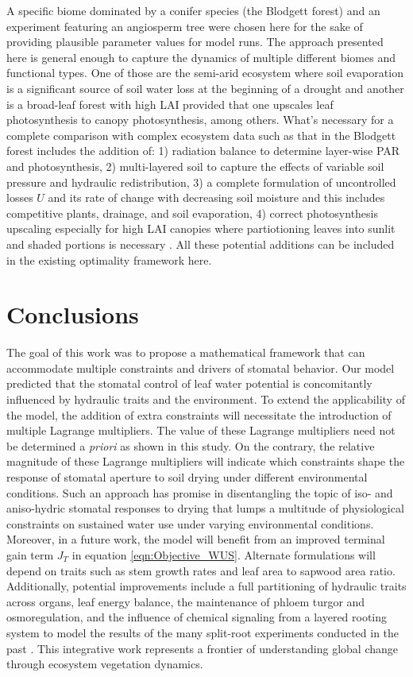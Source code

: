 \documentclass[utf8]{frontiersSCNS} %
\begin{document}
A specific biome dominated by a conifer species (the Blodgett forest) and an experiment featuring an angiosperm tree were chosen here for the sake of providing plausible parameter values for model runs. The approach presented here is general enough to capture the dynamics of multiple different biomes and functional types. One of those are the semi-arid ecosystem where soil evaporation is a significant source of soil water loss at the beginning of a drought and another is a broad-leaf forest with high LAI provided that one upscales leaf photosynthesis to canopy photosynthesis, among others. What's necessary for a complete comparison with complex ecosystem data such as that in the Blodgett forest includes the addition of: 1) radiation balance to determine layer-wise PAR and photosynthesis, 2) multi-layered soil to capture the effects of variable soil pressure and hydraulic redistribution, 3) a complete formulation of uncontrolled losses $U$ and its rate of change with decreasing soil moisture and this includes competitive plants, drainage, and soil evaporation, 4) correct photosynthesis upscaling especially for high LAI canopies where partiotioning leaves into sunlit and shaded portions is necessary \citep{pury_1997}. All these potential additions can be included in the existing optimality framework here. 

\section{Conclusions}
The goal of this work was to propose a mathematical framework that can accommodate multiple constraints and drivers of stomatal behavior. Our model predicted that the stomatal control of leaf water potential is concomitantly influenced by hydraulic traits and the environment. To extend the applicability of the model, the addition of extra constraints will necessitate the introduction of multiple Lagrange multipliers. The value of these Lagrange multipliers need not be determined a \textit{priori} as shown in this study. On the contrary, the relative magnitude of these Lagrange multipliers will indicate which constraints shape the response of stomatal aperture to soil drying under different environmental conditions. Such an approach has promise in disentangling the topic of iso- and aniso-hydric stomatal responses to drying that lumps a multitude of physiological constraints on sustained water use under varying environmental conditions. Moreover, in a future work, the model will benefit from an improved terminal gain term $J_T$ in equation \ref{eqn:Objective_WUS}. Alternate formulations will depend on traits such as stem growth rates and leaf area to sapwood area ratio.  Additionally, potential improvements include a full partitioning of hydraulic traits across organs, leaf energy balance, the maintenance of phloem turgor and osmoregulation, and the influence of chemical signaling from a layered rooting system to model the results of the many split-root experiments conducted in the past \citep{blackman1985root, zhang1987control}. This integrative work represents a frontier of understanding global change through ecosystem vegetation dynamics.
\end{document}
